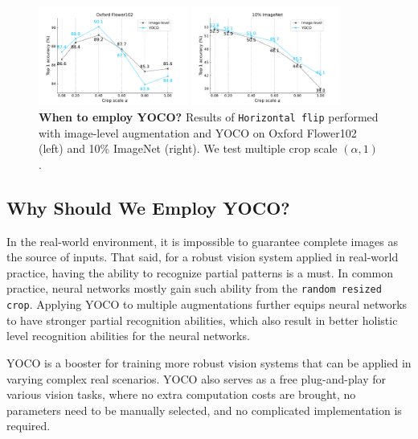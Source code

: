 \documentclass{article}
\begin{document}
\begin{figure}[!htb]
     \centering
    \begin{minipage}[t]{0.49\linewidth} 
    \centering 
\includegraphics[width=4.9cm]{figures/when1.pdf}
  \end{minipage}   
    \begin{minipage}[t]{0.49\linewidth} 
    \centering 
\includegraphics[width=4.9cm]{figures/when2.pdf}
  \end{minipage}   
    \vspace{-3mm}
     \caption{\textbf{When to employ YOCO?} Results of  \texttt{Horizontal flip} performed with image-level augmentation and YOCO on Oxford Flower102 (left) and 10\% ImageNet (right). We test multiple crop scale $(\alpha,1)$.  }
     \label{fig:when}
\end{figure}


\subsection{Why Should We Employ YOCO?}
In the real-world environment, it is impossible to guarantee complete images as the source of inputs. That said, for a robust vision system applied in real-world practice, having the ability to recognize partial patterns is a must. In common practice, neural networks mostly gain such ability from the \texttt{random resized crop}. Applying YOCO to multiple augmentations further equips neural networks to have stronger partial recognition abilities, which also result in better holistic level recognition abilities for the neural networks.

YOCO is a booster for training more robust vision systems that can be applied in varying complex real scenarios. YOCO also serves as a free plug-and-play for various vision tasks, where no extra computation costs are brought, no parameters need to be manually selected, and no complicated implementation is required.
\end{document}

